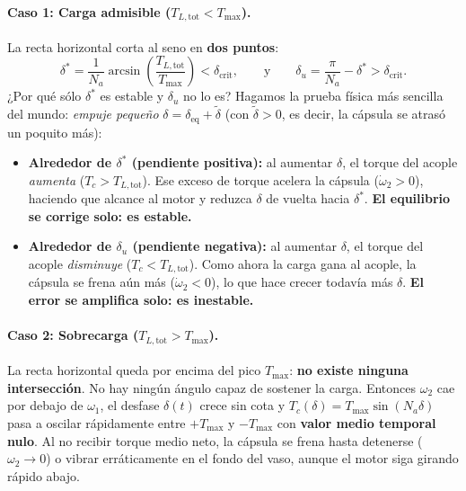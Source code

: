 \documentclass[11pt,a4paper,oneside]{book}
\begin{document}
\paragraph{Caso 1: Carga admisible ($T_{L,\text{tot}} < T_{\max}$).}
La recta horizontal corta al seno en \textbf{dos puntos}:
\[
  \delta^\ast = \frac{1}{N_a}\arcsin\!\left(\frac{T_{L,\text{tot}}}{T_{\max}}\right) < \delta_{\text{crit}},
  \qquad\text{y}\qquad
  \delta_u = \frac{\pi}{N_a} - \delta^\ast > \delta_{\text{crit}}.
\]
¿Por qué sólo $\delta^\ast$ es estable y $\delta_u$ no lo es? Hagamos la prueba
física más sencilla del mundo: \emph{empuje pequeño} $\delta = \delta_{\text{eq}} + \tilde\delta$
(con $\tilde\delta > 0$, es decir, la cápsula se atrasó un poquito más):
\begin{itemize}
  \item \textbf{Alrededor de $\delta^\ast$ (pendiente positiva):} al aumentar
        $\delta$, el torque del acople \emph{aumenta} ($T_c > T_{L,\text{tot}}$).
        Ese exceso de torque acelera la cápsula ($\dot\omega_2 > 0$), haciendo
        que alcance al motor y reduzca $\delta$ de vuelta hacia $\delta^\ast$.
        \textbf{El equilibrio se corrige solo: es estable.}
  \item \textbf{Alrededor de $\delta_u$ (pendiente negativa):} al aumentar
        $\delta$, el torque del acople \emph{disminuye} ($T_c < T_{L,\text{tot}}$).
        Como ahora la carga gana al acople, la cápsula se frena aún más
        ($\dot\omega_2 < 0$), lo que hace crecer todavía más $\delta$.
        \textbf{El error se amplifica solo: es inestable.}
\end{itemize}

\paragraph{Caso 2: Sobrecarga ($T_{L,\text{tot}} > T_{\max}$).}
La recta horizontal queda por encima del pico $T_{\max}$: \textbf{no existe
ninguna intersección}. No hay ningún ángulo capaz de sostener la carga.
Entonces $\omega_2$ cae por debajo de $\omega_1$, el desfase $\delta(t)$ crece
sin cota y $T_c(\delta) = T_{\max}\sin(N_a\delta)$ pasa a oscilar rápidamente
entre $+T_{\max}$ y $-T_{\max}$ con \textbf{valor medio temporal nulo}. Al no
recibir torque medio neto, la cápsula se frena hasta detenerse ($\omega_2 \to 0$)
o vibrar erráticamente en el fondo del vaso, aunque el motor siga girando rápido
abajo.

\end{document}
